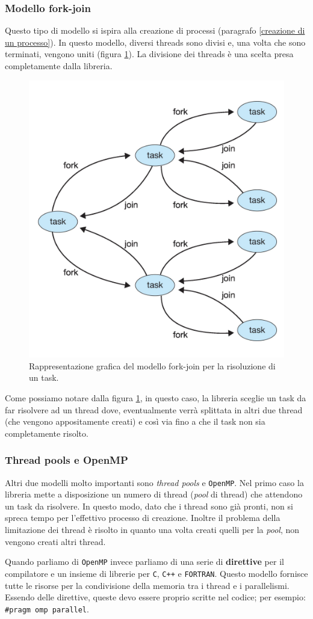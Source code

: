 \subsubsection{Modello fork-join}
Questo tipo di modello si ispira alla creazione di processi (paragrafo \ref{creazione di un processo}). In questo modello, diversi threads sono divisi e, una volta che sono terminati, vengono uniti (figura \ref{fig:fork_join}). La divisione dei threads è una scelta presa completamente dalla libreria.
\begin{figure}
    \centering
    \includegraphics[width = .4\textwidth]{../res/imgs/threads/fork_join.png}
    \caption{Rappresentazione grafica del modello fork-join per la risoluzione di un task.}
    \label{fig:fork_join}
\end{figure}
Come possiamo notare dalla figura \ref{fig:fork_join}, in questo caso, la libreria sceglie un task da far risolvere ad un thread dove, eventualmente verrà splittata in altri due thread (che vengono appositamente creati) e così via fino a che il task non sia completamente risolto.
% 
\subsubsection{Thread pools e OpenMP}
Altri due modelli molto importanti sono \textit{thread pools} e \texttt{OpenMP}. Nel primo caso la libreria mette a disposizione un numero di thread (\textit{pool} di thread) che attendono un  task da risolvere. In questo modo, dato che i thread sono già pronti, non si spreca tempo per l'effettivo processo di creazione. Inoltre il problema della limitazione dei thread è risolto in quanto una volta creati quelli per la \textit{pool}, non vengono creati altri thread. 

Quando parliamo di \texttt{OpenMP} invece parliamo di una serie di \textbf{direttive} per il compilatore e un insieme di librerie per \texttt{C}, \texttt{C++} e \texttt{FORTRAN}. Questo modello fornisce tutte le risorse per la condivisione della memoria tra i thread e i parallelismi. Essendo delle direttive, queste devo essere proprio scritte nel codice; per esempio: \texttt{\#pragm omp parallel}.
% 
